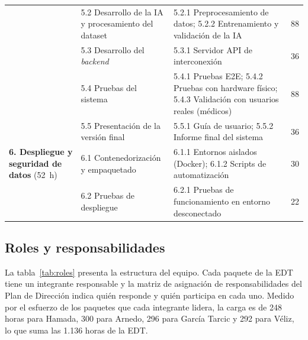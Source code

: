 {\begin{longtable}{@{}p{3.0cm}p{3.4cm}p{6.9cm}p{1.1cm}@{}}
 & 5.2 Desarrollo de la IA y procesamiento del dataset & 5.2.1 Preprocesamiento de datos; 5.2.2 Entrenamiento y validación de la IA & 88 \\
 & 5.3 Desarrollo del \emph{backend} & 5.3.1 Servidor API de interconexión & 36 \\
 & 5.4 Pruebas del sistema & 5.4.1 Pruebas E2E; 5.4.2 Pruebas con hardware físico; 5.4.3 Validación con usuarios reales (médicos) & 88 \\
 & 5.5 Presentación de la versión final & 5.5.1 Guía de usuario; 5.5.2 Informe final del sistema & 36 \\
\midrule
\textbf{6. Despliegue y seguridad de datos} (52~h) & 6.1 Contenedorización y empaquetado & 6.1.1 Entornos aislados (Docker); 6.1.2 Scripts de automatización & 30 \\
 & 6.2 Pruebas de despliegue & 6.2.1 Pruebas de funcionamiento en entorno desconectado & 22 \\
\end{longtable}
}

\subsection{Roles y responsabilidades}

La tabla~\ref{tab:roles} presenta la estructura del equipo. Cada paquete de la EDT tiene un integrante responsable y la matriz de asignación de responsabilidades del Plan de Dirección indica quién responde y quién participa en cada uno. Medido por el esfuerzo de los paquetes que cada integrante lidera, la carga es de 248 horas para Hamada, 300 para Arnedo, 296 para García Tarcic y 292 para Véliz, lo que suma las 1.136 horas de la EDT.

